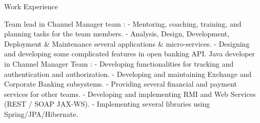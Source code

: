 \begin{jrsection}{Work Experience}
{\begin{jrdescription}
{        Team lead in Channel Manager team :\linebreak
            - Mentoring, coaching, training, and planning tasks for the team members.\linebreak
            - Analysis, Design, Development, Deployment \& Maintenance several applications \& micro-services.\linebreak
            - Designing and developing some complicated features in open banking API.\linebreak
        Java developer in Channel Manager Team :\linebreak
            - Developing functionalities for tracking and authentication and authorization.\linebreak
            - Developing and maintaining Exchange and Corporate Banking subsystems.
            - Providing several financial and payment services for other teams.\linebreak
            - Developing and implementing RMI and Web Services (REST / SOAP JAX-WS).\linebreak
            - Implementing several libraries using Spring/JPA/Hibernate.\linebreak
        }
        \end{jrdescription}
    }
\end{jrsection}
